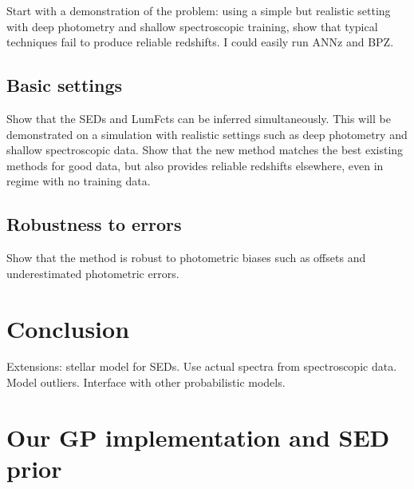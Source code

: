 \documentclass[aps,prd,showpacs,superscriptaddress,groupedaddress]{revtex4}  %
\begin{document}
Start with a demonstration of the problem: using a simple but realistic setting with deep photometry and shallow spectroscopic training, show that typical techniques fail to produce reliable redshifts. I could easily run ANNz and BPZ.


\subsection{Basic settings}

Show that the SEDs and LumFcts can be inferred simultaneously. This will be demonstrated on a simulation with realistic settings such as deep photometry and shallow spectroscopic data. 
Show that the new method matches the best existing methods for good data, but also provides reliable redshifts elsewhere, even in regime with no training data. 

\subsection{Robustness to errors}

Show that the method is robust to photometric biases such as offsets and underestimated photometric errors. 



\section{Conclusion}
Extensions: stellar model for SEDs. Use actual spectra from spectroscopic data. Model outliers. Interface with other probabilistic models.


\footnotesize{
  
\providecommand{\eprint}[1]{\href{http://arxiv.org/abs/#1}{arXiv:#1}}	
  
}
\normalsize


\appendix
\section{Our GP implementation and SED prior}
\end{document}
